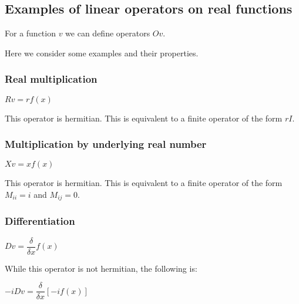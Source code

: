 
\subsection{Examples of linear operators on real functions}

For a function \(v\) we can define operators \(Ov\).

Here we consider some examples and their properties.

\subsubsection{Real multiplication}

\(Rv = rf(x)\)

This operator is hermitian. This is equivalent to a finite operator of the form \(rI\).

\subsubsection{Multiplication by underlying real number}

\(Xv = xf(x)\)

This operator is hermitian. This is equivalent to a finite operator of the form \(M_{ii}=i\) and \(M_{ij}=0\).

\subsubsection{Differentiation}

\(Dv = \dfrac{\delta }{\delta x}f(x)\)

While this operator is not hermitian, the following is:

\(-iDv = \dfrac{\delta }{\delta x}[-if(x)]\)

